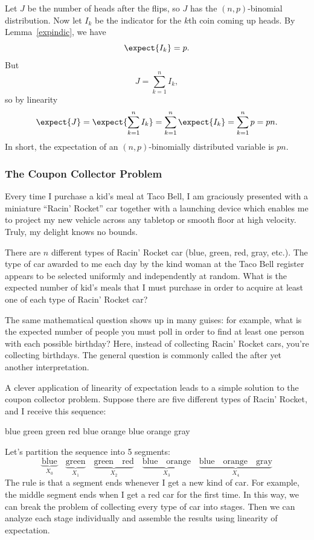 Let $J$ be the number of heads after the flips, so $J$ has the
$(n,p)$-binomial distribution.  Now let $I_k$ be the indicator for the
$k$th coin coming up heads.  By Lemma~\ref{expindic}, we have
\[
\expect{I_k} = p.
\]
But
\[
J = \sum_{k=1}^n I_k,
\]
so by linearity
\[
\expect{J} = \expect{\sum_{k=1}^n I_k} = \sum_{k=1}^n \expect{I_k} =
\sum_{k=1}^n p = pn.
\]
In short, the expectation of an $(n,p)$-binomially distributed variable is
$pn$.


\subsubsection{The Coupon Collector Problem}

Every time I purchase a kid's meal at Taco Bell, I am graciously presented
with a miniature ``Racin' Rocket'' car together with a launching device
which enables me to project my new vehicle across any tabletop or smooth
floor at high velocity.  Truly, my delight knows no bounds.

There are $n$ different types of Racin' Rocket car (blue, green, red,
gray, etc.).  The type of car awarded to me each day by the kind woman
at the Taco Bell register appears to be selected uniformly and
independently at random.  What is the expected number of kid's meals
that I must purchase in order to acquire at least one of each type of
Racin' Rocket car?

The same mathematical question shows up in many guises: for example,
what is the expected number of people you must poll in order to find
at least one person with each possible birthday?  Here, instead of
collecting Racin' Rocket cars, you're collecting birthdays.  The
general question is commonly called the  after yet another interpretation.

A clever application of linearity of expectation leads to a simple
solution to the coupon collector problem.  Suppose there are five
different types of Racin' Rocket, and I receive this sequence:
%
\begin{center}
blue \quad green \quad green \quad red \quad blue \quad orange \quad blue \quad orange \quad gray
\end{center}
%
Let's partition the sequence into 5 segments:
%
\[
\underbrace{\text{blue}}_{X_0} \quad
\underbrace{\text{green}}_{X_1} \quad
\underbrace{\text{green} \quad \text{red}}_{X_2} \quad
\underbrace{\text{blue} \quad \text{orange}}_{X_3} \quad
\underbrace{\text{blue} \quad \text{orange} \quad \text{gray}}_{X_4}
\]
%
The rule is that a segment ends whenever I get a new kind of car.  For
example, the middle segment ends when I get a red car for the first
time.  In this way, we can break the problem of collecting every type
of car into stages.  Then we can analyze each stage individually and
assemble the results using linearity of expectation.

